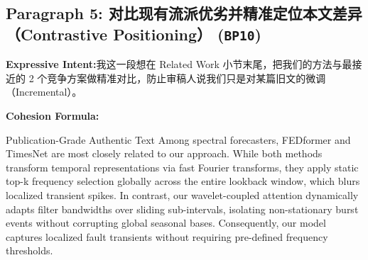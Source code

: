 \subsection*{Paragraph 5: 对比现有流派优劣并精准定位本文差异（Contrastive Positioning） (\texttt{BP10})}
\noindent\textbf{Expressive Intent:}\enspace 我这一段想在 Related Work 小节末尾，把我们的方法与最接近的 2 个竞争方案做精准对比，防止审稿人说我们只是对某篇旧文的微调（Incremental）。\par
\noindent\textbf{Cohesion Formula:}\par\vspace{4pt}
\begin{ExampleBox}{Publication-Grade Authentic Text}
Among spectral forecasters, FEDformer and TimesNet are most closely related to our approach. While both methods transform temporal representations via fast Fourier transforms, they apply static top-k frequency selection globally across the entire lookback window, which blurs localized transient spikes. In contrast, our wavelet-coupled attention dynamically adapts filter bandwidths over sliding sub-intervals, isolating non-stationary burst events without corrupting global seasonal bases. Consequently, our model captures localized fault transients without requiring pre-defined frequency thresholds.
\end{ExampleBox}
